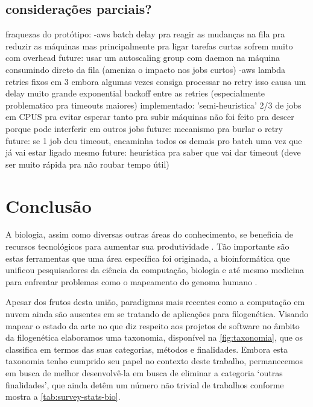\documentclass[english,brazilian]{UNISINOSmonografia} %
\begin{document}
\section{considerações parciais?}

fraquezas do protótipo:
	-aws batch
		delay pra reagir as mudanças na fila
		pra reduzir as máquinas
		mas principalmente pra ligar
		tarefas curtas sofrem muito com overhead
		future: usar um autoscaling group com daemon na máquina consumindo direto da fila (ameniza o impacto nos jobs curtos)
	-aws lambda
		retries fixos em 3
		embora algumas vezes consiga processar no retry isso causa um delay muito grande
		exponential backoff entre as retries (especialmente problematico pra timeouts maiores)
		implementado: 'semi-heuristica' 2/3 de jobs em CPUS pra evitar esperar tanto pra subir máquinas
		não foi feito pra descer porque pode interferir em outros jobs
		future: mecanismo pra burlar o retry
		future: se 1 job deu timeout, encaminha todos os demais pro batch uma vez que já vai estar ligado mesmo
		future: heurística pra saber que vai dar timeout (deve ser muito rápida pra não roubar tempo útil)







\chapter{Conclusão}
\label{ch:conclusao}



A biologia, assim como diversas outras áreas do conhecimento, se beneficia de recursos tecnológicos para aumentar sua produtividade \cite{Denning2009}.
Tão importante são estas ferramentas que uma área específica foi originada, a bioinformática que unificou pesquisadores da ciência da computação, biologia e até mesmo medicina para enfrentar problemas como o mapeamento do genoma humano \cite{Venter2001}.


Apesar dos frutos desta união, paradigmas mais recentes como a computação em nuvem ainda são ausentes em se tratando de aplicações para filogenética.
Visando mapear o estado da arte no que diz respeito aos projetos de software no âmbito da filogenética elaboramos uma taxonomia, disponível na \autoref{fig:taxonomia}, que os classifica em termos das suas categorias, métodos e finalidades.
Embora esta taxonomia tenho cumprido seu papel no contexto deste trabalho, permanecemos em busca de melhor desenvolvê-la em busca de eliminar a categoria \textquoteleft outras finalidades\textquoteright, que ainda detêm um número não trivial de trabalhos conforme mostra a \autoref{tab:survey-stats-bio}.
\end{document}
